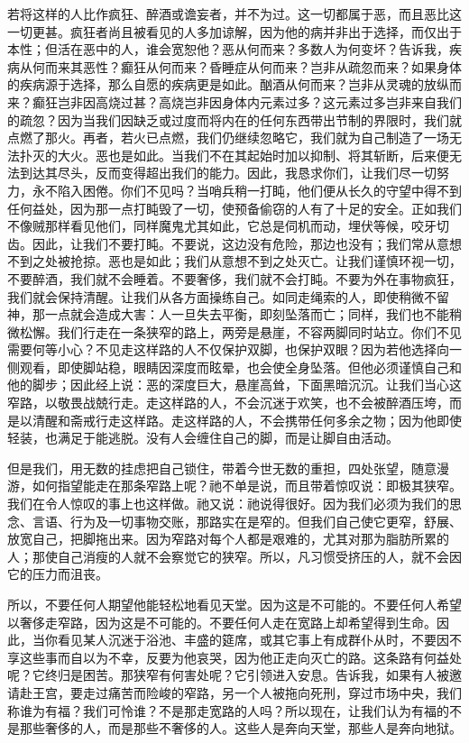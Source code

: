 若将这样的人比作疯狂、醉酒或谵妄者，并不为过。这一切都属于恶，而且恶比这一切更甚。疯狂者尚且被看见的人多加谅解，因为他的病并非出于选择，而仅出于本性；但活在恶中的人，谁会宽恕他？恶从何而来？多数人为何变坏？告诉我，疾病从何而来其恶性？癫狂从何而来？昏睡症从何而来？岂非从疏忽而来？如果身体的疾病源于选择，那么自愿的疾病更是如此。酗酒从何而来？岂非从灵魂的放纵而来？癫狂岂非因高烧过甚？高烧岂非因身体内元素过多？这元素过多岂非来自我们的疏忽？因为当我们因缺乏或过度而将内在的任何东西带出节制的界限时，我们就点燃了那火。再者，若火已点燃，我们仍继续忽略它，我们就为自己制造了一场无法扑灭的大火。恶也是如此。当我们不在其起始时加以抑制、将其斩断，后来便无法到达其尽头，反而变得超出我们的能力。因此，我恳求你们，让我们尽一切努力，永不陷入困倦。你们不见吗？当哨兵稍一打盹，他们便从长久的守望中得不到任何益处，因为那一点打盹毁了一切，使预备偷窃的人有了十足的安全。正如我们不像贼那样看见他们，同样魔鬼尤其如此，它总是伺机而动，埋伏等候，咬牙切齿。因此，让我们不要打盹。不要说，这边没有危险，那边也没有；我们常从意想不到之处被抢掠。恶也是如此；我们从意想不到之处灭亡。让我们谨慎环视一切，不要醉酒，我们就不会睡着。不要奢侈，我们就不会打盹。不要为外在事物疯狂，我们就会保持清醒。让我们从各方面操练自己。如同走绳索的人，即使稍微不留神，那一点就会造成大害：人一旦失去平衡，即刻坠落而亡；同样，我们也不能稍微松懈。我们行走在一条狭窄的路上，两旁是悬崖，不容两脚同时站立。你们不见需要何等小心？不见走这样路的人不仅保护双脚，也保护双眼？因为若他选择向一侧观看，即使脚站稳，眼睛因深度而眩晕，也会使全身坠落。但他必须谨慎自己和他的脚步；因此经上说：恶的深度巨大，悬崖高耸，下面黑暗沉沉。让我们当心这窄路，以敬畏战兢行走。走这样路的人，不会沉迷于欢笑，也不会被醉酒压垮，而是以清醒和斋戒行走这样路。走这样路的人，不会携带任何多余之物；因为他即使轻装，也满足于能逃脱。没有人会缠住自己的脚，而是让脚自由活动。\par

但是我们，用无数的挂虑把自己锁住，带着今世无数的重担，四处张望，随意漫游，如何指望能走在那条窄路上呢？祂不单是说，而且带着惊叹说：即极其狭窄。我们在令人惊叹的事上也这样做。祂又说：祂说得很好。因为我们必须为我们的思念、言语、行为及一切事物交账，那路实在是窄的。但我们自己使它更窄，舒展、放宽自己，把脚拖出来。因为窄路对每个人都是艰难的，尤其对那为脂肪所累的人；那使自己消瘦的人就不会察觉它的狭窄。所以，凡习惯受挤压的人，就不会因它的压力而沮丧。\par

所以，不要任何人期望他能轻松地看见天堂。因为这是不可能的。不要任何人希望以奢侈走窄路，因为这是不可能的。不要任何人走在宽路上却希望得到生命。因此，当你看见某人沉迷于浴池、丰盛的筵席，或其它事上有成群仆从时，不要因不享这些事而自以为不幸，反要为他哀哭，因为他正走向灭亡的路。这条路有何益处呢？它终归是困苦。那狭窄有何害处呢？它引领进入安息。告诉我，如果有人被邀请赴王宫，要走过痛苦而险峻的窄路，另一个人被拖向死刑，穿过市场中央，我们称谁为有福？我们可怜谁？不是那走宽路的人吗？所以现在，让我们认为有福的不是那些奢侈的人，而是那些不奢侈的人。这些人是奔向天堂，那些人是奔向地狱。\par

